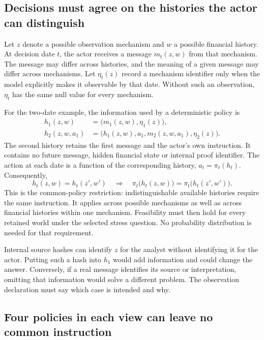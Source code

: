\subsection{Decisions must agree on the histories the actor can distinguish}

Let $z$ denote a possible observation mechanism and $w$ a possible financial history. At decision date $t$, the actor receives a message $m_t(z,w)$ from that mechanism. The message may differ across histories, and the meaning of a given message may differ across mechanisms. Let $\eta_t(z)$ record a mechanism identifier only when the model explicitly makes it observable by that date. Without such an observation, $\eta_t$ has the same null value for every mechanism.

For the two-date example, the information used by a deterministic policy is
\begin{align}
 h_1(z,w)&=\bigl(m_1(z,w),\eta_1(z)\bigr),\\
 h_2(z,w,a_1)&=\bigl(h_1(z,w),a_1,m_2(z,w,a_1),\eta_2(z)\bigr).
 \label{eq:common-mechanism-history}
\end{align}
The second history retains the first message and the actor's own instruction. It contains no future message, hidden financial state or internal proof identifier. The action at each date is a function of the corresponding history, $a_t=\pi_t(h_t)$. Consequently,
\begin{equation}
 h_t(z,w)=h_t(z',w')\quad\Longrightarrow\quad
 \pi_t\bigl(h_t(z,w)\bigr)=\pi_t\bigl(h_t(z',w')\bigr).
 \label{eq:cross-mechanism-nonanticipation}
\end{equation}
This is the common-policy restriction: indistinguishable available histories require the same instruction. It applies across possible mechanisms as well as across financial histories within one mechanism. Feasibility must then hold for every retained world under the selected stress question. No probability distribution is needed for that requirement.

Internal source hashes can identify $z$ for the analyst without identifying it for the actor. Putting such a hash into $h_1$ would add information and could change the answer. Conversely, if a real message identifies its source or interpretation, omitting that information would solve a different problem. The observation declaration must say which case is intended and why.

\subsection{Four policies in each view can leave no common instruction}

